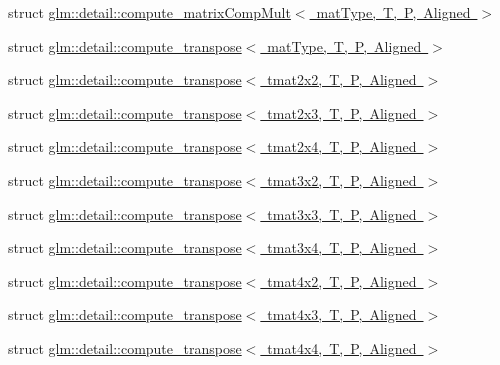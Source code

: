 \begin{DoxyCompactItemize}
\item 
struct \mbox{\hyperlink{structglm_1_1detail_1_1compute__matrix_comp_mult}{glm\+::detail\+::compute\+\_\+matrix\+Comp\+Mult$<$ mat\+Type, T, P, Aligned $>$}}
\item 
struct \mbox{\hyperlink{structglm_1_1detail_1_1compute__transpose}{glm\+::detail\+::compute\+\_\+transpose$<$ mat\+Type, T, P, Aligned $>$}}
\item 
struct \mbox{\hyperlink{structglm_1_1detail_1_1compute__transpose_3_01tmat2x2_00_01_t_00_01_p_00_01_aligned_01_4}{glm\+::detail\+::compute\+\_\+transpose$<$ tmat2x2, T, P, Aligned $>$}}
\item 
struct \mbox{\hyperlink{structglm_1_1detail_1_1compute__transpose_3_01tmat2x3_00_01_t_00_01_p_00_01_aligned_01_4}{glm\+::detail\+::compute\+\_\+transpose$<$ tmat2x3, T, P, Aligned $>$}}
\item 
struct \mbox{\hyperlink{structglm_1_1detail_1_1compute__transpose_3_01tmat2x4_00_01_t_00_01_p_00_01_aligned_01_4}{glm\+::detail\+::compute\+\_\+transpose$<$ tmat2x4, T, P, Aligned $>$}}
\item 
struct \mbox{\hyperlink{structglm_1_1detail_1_1compute__transpose_3_01tmat3x2_00_01_t_00_01_p_00_01_aligned_01_4}{glm\+::detail\+::compute\+\_\+transpose$<$ tmat3x2, T, P, Aligned $>$}}
\item 
struct \mbox{\hyperlink{structglm_1_1detail_1_1compute__transpose_3_01tmat3x3_00_01_t_00_01_p_00_01_aligned_01_4}{glm\+::detail\+::compute\+\_\+transpose$<$ tmat3x3, T, P, Aligned $>$}}
\item 
struct \mbox{\hyperlink{structglm_1_1detail_1_1compute__transpose_3_01tmat3x4_00_01_t_00_01_p_00_01_aligned_01_4}{glm\+::detail\+::compute\+\_\+transpose$<$ tmat3x4, T, P, Aligned $>$}}
\item 
struct \mbox{\hyperlink{structglm_1_1detail_1_1compute__transpose_3_01tmat4x2_00_01_t_00_01_p_00_01_aligned_01_4}{glm\+::detail\+::compute\+\_\+transpose$<$ tmat4x2, T, P, Aligned $>$}}
\item 
struct \mbox{\hyperlink{structglm_1_1detail_1_1compute__transpose_3_01tmat4x3_00_01_t_00_01_p_00_01_aligned_01_4}{glm\+::detail\+::compute\+\_\+transpose$<$ tmat4x3, T, P, Aligned $>$}}
\item 
struct \mbox{\hyperlink{structglm_1_1detail_1_1compute__transpose_3_01tmat4x4_00_01_t_00_01_p_00_01_aligned_01_4}{glm\+::detail\+::compute\+\_\+transpose$<$ tmat4x4, T, P, Aligned $>$}}
\item 

\end{DoxyCompactItemize}

